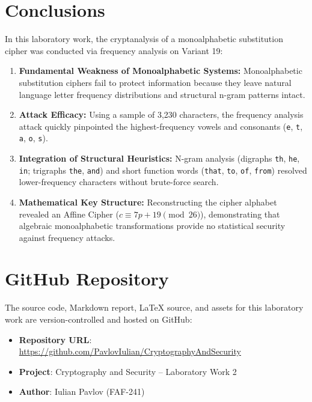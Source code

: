 \documentclass[12pt,a4paper]{article}
\begin{document}
\section{Conclusions}
In this laboratory work, the cryptanalysis of a monoalphabetic substitution cipher was conducted via frequency analysis on Variant 19:
\begin{enumerate}
    \item \textbf{Fundamental Weakness of Monoalphabetic Systems:} Monoalphabetic substitution ciphers fail to protect information because they leave natural language letter frequency distributions and structural n-gram patterns intact.
    \item \textbf{Attack Efficacy:} Using a sample of 3,230 characters, the frequency analysis attack quickly pinpointed the highest-frequency vowels and consonants (\texttt{e}, \texttt{t}, \texttt{a}, \texttt{o}, \texttt{s}).
    \item \textbf{Integration of Structural Heuristics:} N-gram analysis (digraphs \texttt{th}, \texttt{he}, \texttt{in}; trigraphs \texttt{the}, \texttt{and}) and short function words (\texttt{that}, \texttt{to}, \texttt{of}, \texttt{from}) resolved lower-frequency characters without brute-force search.
    \item \textbf{Mathematical Key Structure:} Reconstructing the cipher alphabet revealed an Affine Cipher ($c \equiv 7p + 19 \pmod{26}$), demonstrating that algebraic monoalphabetic transformations provide no statistical security against frequency attacks.
\end{enumerate}

\section{GitHub Repository}
The source code, Markdown report, LaTeX source, and assets for this laboratory work are version-controlled and hosted on GitHub:
\begin{itemize}
    \item \textbf{Repository URL}: \url{https://github.com/PavlovIulian/CryptographyAndSecurity}
    \item \textbf{Project}: Cryptography and Security -- Laboratory Work 2
    \item \textbf{Author}: Iulian Pavlov (FAF-241)
\end{itemize}
\end{document}
